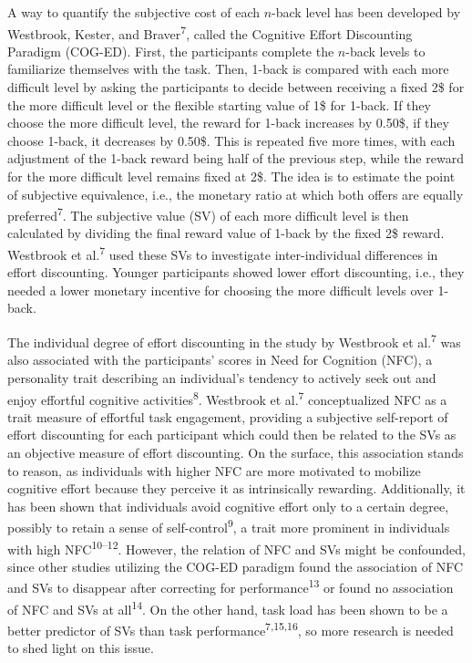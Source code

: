 \documentclass[
  man,floatsintext]{apa6}
\begin{document}
A way to quantify the subjective cost of each \(n\)-back level has been developed by Westbrook, Kester, and Braver\textsuperscript{7}, called the Cognitive Effort Discounting Paradigm (COG-ED).
First, the participants complete the \(n\)-back levels to familiarize themselves with the task.
Then, 1-back is compared with each more difficult level by asking the participants to decide between receiving a fixed 2\$ for the more difficult level or the flexible starting value of 1\$ for 1-back.
If they choose the more difficult level, the reward for 1-back increases by 0.50\$, if they choose 1-back, it decreases by 0.50\$.
This is repeated five more times, with each adjustment of the 1-back reward being half of the previous step, while the reward for the more difficult level remains fixed at 2\$.
The idea is to estimate the point of subjective equivalence, i.e., the monetary ratio at which both offers are equally preferred\textsuperscript{7}.
The subjective value (SV) of each more difficult level is then calculated by dividing the final reward value of 1-back by the fixed 2\$ reward.
Westbrook et al.\textsuperscript{7} used these SVs to investigate inter-individual differences in effort discounting.
Younger participants showed lower effort discounting, i.e., they needed a lower monetary incentive for choosing the more difficult levels over 1-back.

The individual degree of effort discounting in the study by Westbrook et al.\textsuperscript{7} was also associated with the participants' scores in Need for Cognition (NFC), a personality trait describing an individual's tendency to actively seek out and enjoy effortful cognitive activities\textsuperscript{8}.
Westbrook et al.\textsuperscript{7} conceptualized NFC as a trait measure of effortful task engagement, providing a subjective self-report of effort discounting for each participant which could then be related to the SVs as an objective measure of effort discounting.
On the surface, this association stands to reason, as individuals with higher NFC are more motivated to mobilize cognitive effort because they perceive it as intrinsically rewarding.
Additionally, it has been shown that individuals avoid cognitive effort only to a certain degree, possibly to retain a sense of self-control\textsuperscript{9}, a trait more prominent in individuals with high NFC\textsuperscript{10--12}.
However, the relation of NFC and SVs might be confounded, since other studies utilizing the COG-ED paradigm found the association of NFC and SVs to disappear after correcting for performance\textsuperscript{13} or found no association of NFC and SVs at all\textsuperscript{14}.
On the other hand, task load has been shown to be a better predictor of SVs than task performance\textsuperscript{7,15,16}, so more research is needed to shed light on this issue.
\end{document}
